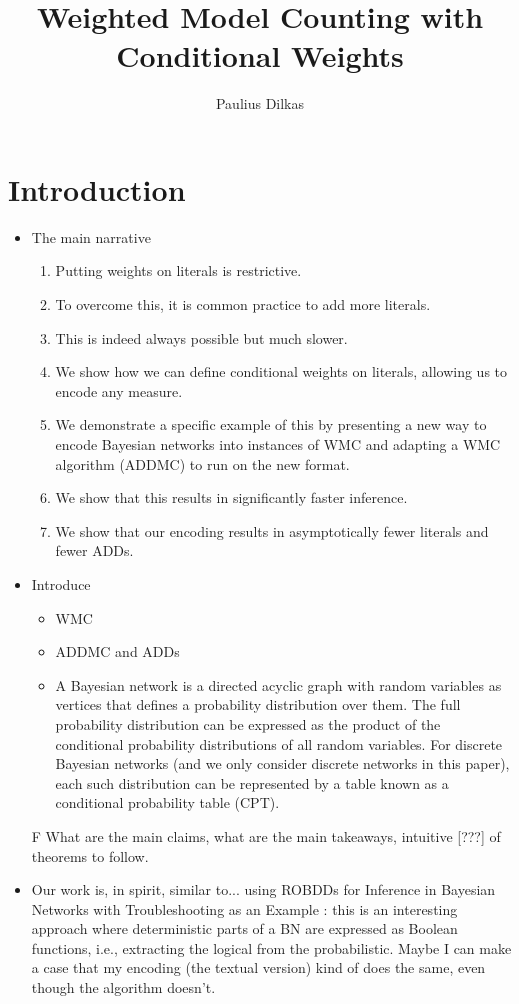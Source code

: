 \documentclass{article}
\title{Weighted Model Counting with Conditional Weights}
\author{Paulius Dilkas}
\theoremstyle{definition}
\theoremstyle{remark}
\begin{document}
\maketitle

\section{Introduction}

\begin{itemize}
\item The main narrative
  \begin{enumerate}
  \item Putting weights on literals is restrictive.
  \item To overcome this, it is common practice to add more literals.
  \item This is indeed always possible but much slower.
  \item We show how we can define conditional weights on literals, allowing us
    to encode any measure.
  \item We demonstrate a specific example of this by presenting a new way to
    encode Bayesian networks into instances of WMC and adapting a WMC algorithm
    (ADDMC) to run on the new format.
  \item We show that this results in significantly faster inference.
  \item We show that our encoding results in asymptotically fewer literals and
    fewer ADDs.
  \end{enumerate}
\item Introduce
  \begin{itemize}
  \item WMC \cite{DBLP:conf/aaai/SangBK05}
  \item ADDMC \cite{DBLP:conf/aaai/DudekPV20} and ADDs
    \cite{DBLP:journals/fmsd/BaharFGHMPS97}
  \item A Bayesian network is a directed acyclic graph with random variables as
    vertices that defines a probability distribution over them. The full
    probability distribution can be expressed as the product of the conditional
    probability distributions of all random variables. For discrete Bayesian
    networks (and we only consider discrete networks in this paper), each such
    distribution can be represented by a table known as a conditional
    probability table (CPT).
  \end{itemize}
\item[F] What are the main claims, what are the main takeaways, intuitive [???]
  of theorems to follow.
\item Our work is, in spirit, similar to... using ROBDDs for Inference in
  Bayesian Networks with Troubleshooting as an Example
  \cite{DBLP:conf/uai/NielsenWJK00}: this is an interesting approach where
  deterministic parts of a BN are expressed as Boolean functions, i.e.,
  extracting the logical from the probabilistic. Maybe I can make a case that my
  encoding (the textual version) kind of does the same, even though the
  algorithm doesn't.
\end{itemize}
\end{document}
